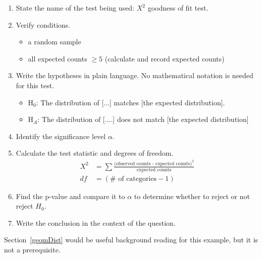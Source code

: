 \begin{termBox}{
\begin{enumerate}
\setlength{\itemsep}{0mm}
\item State the name of the test being used: $X^2$ goodness of fit test.
\item Verify conditions.\vspace{-1.5mm}
\begin{itemize}
\setlength{\itemsep}{0mm}
\item a random sample
\item all expected counts $\ge 5$ (calculate and record expected counts)
\end{itemize}
\item Write the hypotheses in plain language. No mathematical notation is needed for this test.\vspace{-1.5mm}
\begin{itemize}
\setlength{\itemsep}{0mm}
\item H$_0$: The distribution of [...] matches [the expected distribution].
\item H$_A$: The distribution of [....] does not match [the expected distribution]
\end{itemize}
\item Identify the significance level $\alpha$.
\item Calculate the test statistic and degrees of freedom.\vspace{-2mm}
\begin{align*}
X^2 &= \sum{\frac{\text{(observed counts - expected counts)}^2}{\text{expected counts}}} \\
df &= (\# \text{ of categories} - 1)
\end{align*}
\item Find the p-value and compare it to $\alpha$ to determine whether to reject or not reject $H_0$.
\item Write the conclusion in the context of the question.
\end{enumerate}}
\end{termBox}

Section~\ref{geomDist} would be useful background reading for this example, but it is not a prerequisite.


